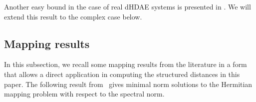 \documentclass[11pt]{article}
\newtheorem{theorem}{Theorem}
\begin{document}
Another easy bound in the case of real dHDAE systems is presented in \cite{MehMW21}.
%
%
%
%
%
%
%
%
%
%
We will extend this result to the complex case below.

\subsection{Mapping results}\label{sec:mapping}
In this subsection, we recall some mapping results from the literature in a form that allows a direct application in computing the structured distances in this paper.
The following result from~\cite{MacMT08} gives minimal norm solutions to the Hermitian mapping problem with respect to the spectral norm.
\end{document}
